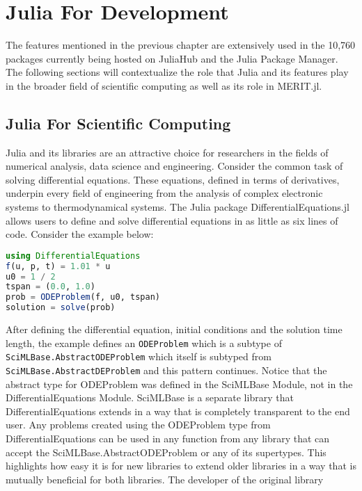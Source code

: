\setcounter{chapter}{3}
\setcounter{section}{0}
\setcounter{subsection}{0}

\chapter*{Julia For Development}
The features mentioned in the previous chapter are extensively used in the 10,760 packages currently being hosted on
JuliaHub and the Julia Package Manager. The following sections will contextualize the role that Julia and its features
play in the broader field of scientific computing as well as its role in MERIT.jl. 

\section{Julia For Scientific Computing}
Julia and its libraries are an attractive choice for researchers in the fields of numerical analysis, data science and
engineering. Consider the common task of solving differential equations. These equations, defined in terms of
derivatives, underpin every field of engineering from the analysis of complex electronic systems to thermodynamical
systems. The Julia package DifferentialEquations.jl \cite{rackauckas2017differentialequations} allows users to define
and solve differential equations in as little as six lines of code. Consider the example below:
\begin{lstlisting}[language=Julia]
using DifferentialEquations
f(u, p, t) = 1.01 * u
u0 = 1 / 2
tspan = (0.0, 1.0)
prob = ODEProblem(f, u0, tspan)
solution = solve(prob)
\end{lstlisting}
After defining the differential equation, initial conditions and the solution time length, the example defines an
\lstinline[language=Julia]{ODEProblem} which is a subtype of \lstinline[language=Julia]{SciMLBase.AbstractODEProblem} which
itself is subtyped from \lstinline[language=Julia]{SciMLBase.AbstractDEProblem} and this pattern continues. Notice that
the abstract type for ODEProblem was defined in the SciMLBase Module, not in the DifferentialEquations Module. SciMLBase
is a separate library that DifferentialEquations extends in a way that is completely transparent to the end user. Any
problems created using the ODEProblem type from DifferentialEquations can be used in any function from any library that
can accept the SciMLBase.AbstractODEProblem or any of its supertypes. This highlights how easy it is for new libraries
to extend older libraries in a way that is mutually beneficial for both libraries. The developer of the original library
